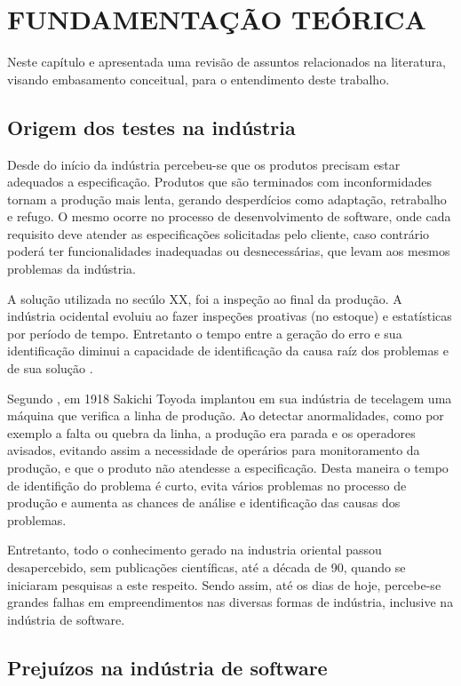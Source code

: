 \chapter{FUNDAMENTAÇÃO TEÓRICA}

Neste capítulo e apresentada uma revisão de assuntos relacionados na literatura, visando embasamento conceitual, para o entendimento deste trabalho.

\section{Origem dos testes na indústria}

Desde do início da indústria percebeu-se que os produtos precisam estar adequados a especificação. Produtos que são terminados com inconformidades tornam a produção mais lenta, gerando desperdícios como adaptação, retrabalho e refugo. O mesmo ocorre no processo de desenvolvimento de software, onde cada requisito deve atender as especificações solicitadas pelo cliente, caso contrário poderá ter funcionalidades inadequadas ou desnecessárias, que levam aos mesmos problemas da indústria.

A solução utilizada no secúlo XX, foi a inspeção ao final da produção. A indústria ocidental evoluiu ao fazer inspeções proativas (no estoque) e estatísticas por período de tempo. Entretanto o tempo entre a geração do erro e sua identificação diminui a capacidade de identificação da causa raíz dos problemas e de sua solução \cite{CARVALHO}.

Segundo , em 1918 Sakichi Toyoda implantou em sua indústria de tecelagem uma máquina que verifica a linha de produção. Ao detectar anormalidades, como por exemplo a falta ou quebra da linha, a produção era parada e os operadores avisados, evitando assim a necessidade de operários para monitoramento da produção, e que o produto não atendesse a especificação. Desta maneira o tempo de identifição do problema é curto, evita vários problemas no processo de produção e aumenta as chances de análise e identificação das causas dos problemas.

Entretanto, todo o conhecimento gerado na industria oriental passou desapercebido, sem publicações científicas, até a década de 90, quando se iniciaram pesquisas a este respeito. Sendo assim, até os dias de hoje, percebe-se grandes falhas em empreendimentos nas diversas formas de indústria, inclusive na indústria de software.

\section{Prejuízos na indústria de software}


